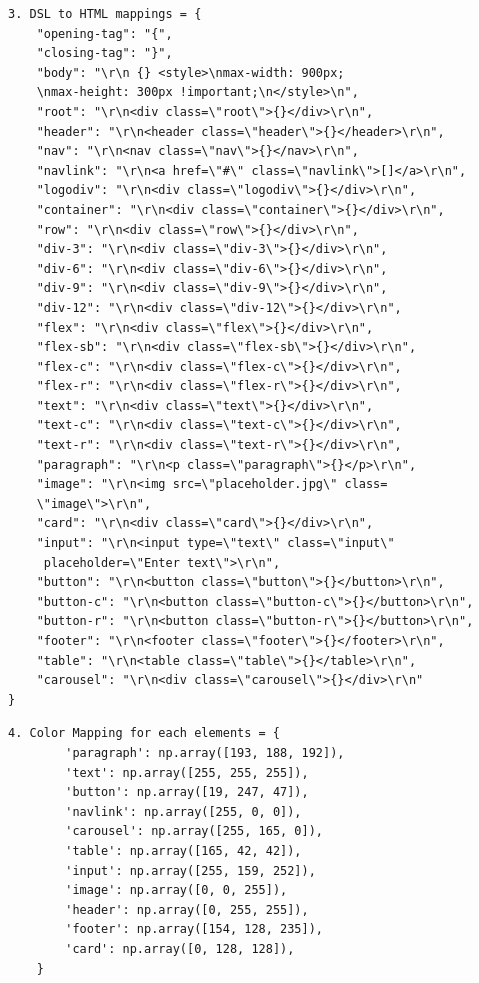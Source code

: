 \documentclass{ioereport}
\begin{document}
\begin{verbatim}
3. DSL to HTML mappings = {
    "opening-tag": "{",
    "closing-tag": "}",
    "body": "\r\n {} <style>\nmax-width: 900px;
    \nmax-height: 300px !important;\n</style>\n",
    "root": "\r\n<div class=\"root\">{}</div>\r\n",
    "header": "\r\n<header class=\"header\">{}</header>\r\n",
    "nav": "\r\n<nav class=\"nav\">{}</nav>\r\n",
    "navlink": "\r\n<a href=\"#\" class=\"navlink\">[]</a>\r\n",
    "logodiv": "\r\n<div class=\"logodiv\">{}</div>\r\n",
    "container": "\r\n<div class=\"container\">{}</div>\r\n",
    "row": "\r\n<div class=\"row\">{}</div>\r\n",
    "div-3": "\r\n<div class=\"div-3\">{}</div>\r\n",
    "div-6": "\r\n<div class=\"div-6\">{}</div>\r\n",
    "div-9": "\r\n<div class=\"div-9\">{}</div>\r\n",
    "div-12": "\r\n<div class=\"div-12\">{}</div>\r\n",
    "flex": "\r\n<div class=\"flex\">{}</div>\r\n",
    "flex-sb": "\r\n<div class=\"flex-sb\">{}</div>\r\n",
    "flex-c": "\r\n<div class=\"flex-c\">{}</div>\r\n",
    "flex-r": "\r\n<div class=\"flex-r\">{}</div>\r\n",
    "text": "\r\n<div class=\"text\">{}</div>\r\n",
    "text-c": "\r\n<div class=\"text-c\">{}</div>\r\n",
    "text-r": "\r\n<div class=\"text-r\">{}</div>\r\n",
    "paragraph": "\r\n<p class=\"paragraph\">{}</p>\r\n",
    "image": "\r\n<img src=\"placeholder.jpg\" class=
    \"image\">\r\n",
    "card": "\r\n<div class=\"card\">{}</div>\r\n",
    "input": "\r\n<input type=\"text\" class=\"input\" 
     placeholder=\"Enter text\">\r\n",
    "button": "\r\n<button class=\"button\">{}</button>\r\n",
    "button-c": "\r\n<button class=\"button-c\">{}</button>\r\n",
    "button-r": "\r\n<button class=\"button-r\">{}</button>\r\n",
    "footer": "\r\n<footer class=\"footer\">{}</footer>\r\n",
    "table": "\r\n<table class=\"table\">{}</table>\r\n",
    "carousel": "\r\n<div class=\"carousel\">{}</div>\r\n"
}
\end{verbatim}
\begin{verbatim}
4. Color Mapping for each elements = {
        'paragraph': np.array([193, 188, 192]),
        'text': np.array([255, 255, 255]),
        'button': np.array([19, 247, 47]),
        'navlink': np.array([255, 0, 0]),
        'carousel': np.array([255, 165, 0]),
        'table': np.array([165, 42, 42]),
        'input': np.array([255, 159, 252]),
        'image': np.array([0, 0, 255]),
        'header': np.array([0, 255, 255]),
        'footer': np.array([154, 128, 235]),
        'card': np.array([0, 128, 128]),
    }
    \end{verbatim}
    

\pagebreak



\end{document}
